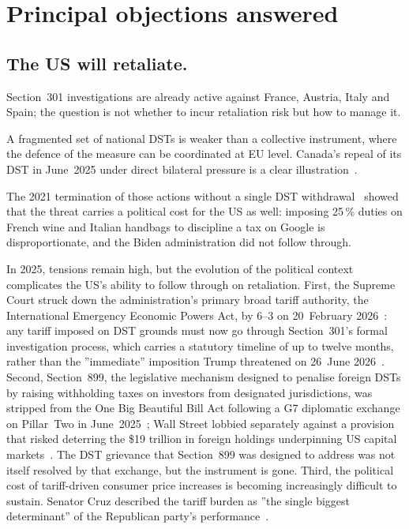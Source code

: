 \documentclass[../../main]{subfiles}
\begin{document}
\section{Principal objections answered}
\label{sec:feasibility:objections}

\subsection*{The US will retaliate.}

Section~301 investigations are already active against France, Austria, Italy and Spain; the question is not whether to incur retaliation risk but how to manage it.

A fragmented set of national DSTs is weaker than a collective instrument, where the defence of the measure can be coordinated at EU level.
Canada's repeal of its DST in June~2025 under direct bilateral pressure is a clear illustration~\citep{canada_finance_rescission_jun2025}.

The 2021 termination of those actions without a single DST withdrawal~\citep{wilmerhale_nov2021} showed that the threat carries a political cost for the US as well: imposing 25\,\% duties on French wine and Italian handbags to discipline a tax on Google is disproportionate, and the Biden administration did not follow through.

In 2025, tensions remain high, but the evolution of the political context complicates the US's ability to follow through on retaliation.%
First, the Supreme Court struck down the administration's primary broad tariff authority, the International Emergency Economic Powers Act, by 6--3 on 20~February 2026~\citep{scotus_ieepa_2026}: any tariff imposed on DST grounds must now go through Section~301's formal investigation process, which carries a statutory timeline of up to twelve months, rather than the ''immediate'' imposition Trump threatened on 26~June 2026~\citep{trump_dst_100pct_jun2026}.
Second, Section~899, the legislative mechanism designed to penalise foreign DSTs by raising withholding taxes on investors from designated jurisdictions, was stripped from the One Big Beautiful Bill Act following a G7 diplomatic exchange on Pillar~Two in June~2025~\citep{g7_shared_understanding_jun2025}; Wall Street lobbied separately against a provision that risked deterring the \$19 trillion in foreign holdings underpinning US capital markets~\citep{cnbc_s899_wallstreet_jun2025}. The DST grievance that Section~899 was designed to address was not itself resolved by that exchange, but the instrument is gone.
Third, the political cost of tariff-driven consumer price increases is becoming increasingly difficult to sustain. Senator Cruz described the tariff burden as ''the single biggest determinant'' of the Republican party's performance~\citep{cruz_podcast_apr2025}.
\end{document}
